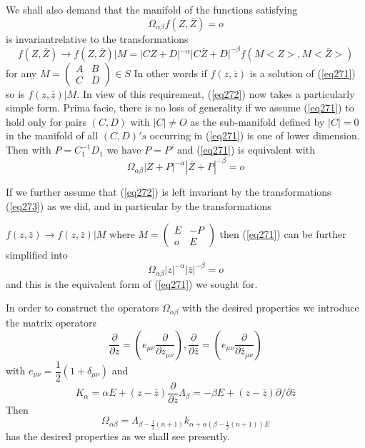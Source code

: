 We shall also demand that the manifold of the functions  satisfying
\begin{equation*}
\Omega_{\alpha \beta}f (Z,\bar{Z})=o \tag{272}\label{eq272}  
\end{equation*}
is invariant\pageoriginale relative to the transformations
\begin{equation*}
f(Z,\bar{Z}) \to f(Z,\bar{Z})|M=|CZ+D|^{-\alpha}|C\bar{Z}+D|^{-
  \beta}f(M<Z>,M<\bar{Z}>) \tag{273}\label{eq273}   
\end{equation*}
for any $M=\begin{pmatrix}A & B \\ C & D \end {pmatrix} \in S$ In
other words if $f (z,\bar{z})$ is a solution of (\ref{eq271}) so is $f
(z,\bar{z})|M$. In view of this requirement, (\ref{eq272}) now takes a
particularly simple form. Prima facie, there is no loss of generality
if we assume (\ref{eq271}) to hold only for pairs $(C,D)$ with $|C| \neq O$
as the sub-manifold defined by $|C|=0$ in the manifold of all
$(C,D)'s$ occurring in (\ref{eq271}) is one of lower dimension. Then with
$P=C^{-1}_1 D_1$ we have $P=P'$ and (\ref{eq271}) is equivalent with 
\begin{equation*} 
\Omega_{\alpha \beta}|Z+P|^{-\alpha}| \bar{Z}+P|^{-\beta} =o
\tag{271}\label{eq271'}   
\end{equation*}

If we further assume that (\ref{eq272}) is left invariant by the
transformations (\ref{eq273}) as we did, and in particular by the
transformations 

 $f(z,\bar{z}) \to f (z,\bar{z})|M$ where $M= \begin{pmatrix} E & -P
  \\ o & E \end{pmatrix}$ then (\ref{eq271}) can be further simplified into  
 \begin{equation*}
\Omega_{\alpha \beta}|z|^{-\alpha}|\bar{z}|^{-\beta}=o \tag{274}\label{eq274}  
 \end{equation*} 
 and this is the equivalent form of (\ref{eq271}) we sought for.
 
 In order to construct the operators $\Omega_{\alpha \beta}$ with the
 desired properties we introduce the matrix operators 
 \begin{equation*}
\frac{\partial}{\partial z}=(e_{\mu \nu}\frac{\partial}{\partial
  z_{\mu \nu}}),\frac{\partial}{\partial \bar{z}}=(e_{\mu
  \nu}\frac{\partial}{\partial \bar{z}_{\mu \nu}}) \tag{275}\label{eq275}   
 \end{equation*} 
 with $e_{\mu \nu }=\dfrac{1}{2}(1+\delta_{\mu \nu})$ and  
 \begin{equation*}
K_\alpha = \alpha  E+(z-\bar{z})\frac{\partial}{\partial z}
\Lambda_\beta =-\beta E+(z-\bar{z})\partial/\partial \bar{z}
\tag{276}\label{eq276}    
 \end{equation*}
 Then\pageoriginale
 \begin{equation*}
\Omega_{\alpha \beta} = \Lambda_{\beta- \frac{1}{2}(n+1)}k_{\alpha +
  \alpha (\beta- \frac{1}{2}(n+1)) E} \tag{277}\label{eq277}   
  \end{equation*}  
  has the desired properties as we shall see presently. 

